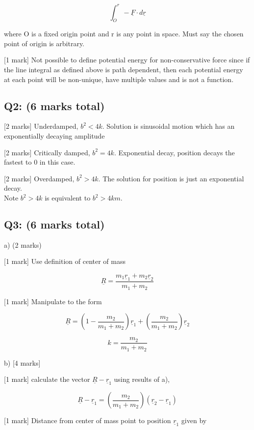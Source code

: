 \documentclass[a4paper,11pt]{article}
\begin{document}
\[ \int_{O}^{r} - \underline{F} \cdot d\underline{r} \] 

where O is a fixed origin point and r is any point in space. Must say the chosen point of origin is arbitrary.  

[1 mark] Not possible to define potential energy for non-conservative force since if the line integral as defined above is path dependent, then each potential energy at each point will be non-unique, have multiple values and is not a function. 

\subsection*{Q2: (6 marks total)}

[2 marks] Underdamped,  \( b^2 < 4k \). Solution is sinusoidal motion which has an exponentially decaying amplitude 

[2 marks] Critically damped, \( b^2 = 4k \). Exponential decay, position decays the fastest to 0 in this case. 

[2 marks] Overdamped, \( b^2 > 4k \). The solution for position is just an exponential decay. \\

Note \( b^2 > 4k \) is equivalent to \( b^2 > 4km \).

\subsection*{Q3: (6 marks total)}

a) (2 marks) 

[1 mark] Use definition of center of mass 

\[ \underline{R} = \frac{m_1 \underline{r}_1 + m_2 \underline{r}_2}{m_1 + m_2} \]

[1 mark] Manipulate to the form 

\[ \underline{R} = \left ( 1 - \frac{m_2}{m_1 + m_2} \right ) \underline{r}_1 + \left ( \frac{m_2}{m_1 + m_2} \right ) \underline{r}_2 \]

\[ k = \frac{m_2}{m_1 + m_2} \]

b) [4 marks] 

[1 mark] calculate the vector \( \underline{R} - \underline{r}_1 \) using results of a), 

\[ \underline{R} - \underline{r}_1 = \left( \frac{m_2}{m_1+m_2} \right )(\underline{r}_2 - \underline{r}_1) \]

[1 mark] Distance from center of mass point to position \( \underline{r}_1 \) given by 
\end{document}
